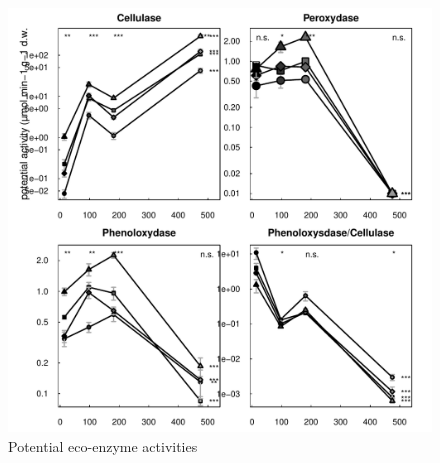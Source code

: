 \documentclass[authoryear,preprint,review,12pt]{elsarticle}
\begin{document}
\newpage
\begin{figure}[h!]
\vspace*{2mm}
\begin{center}
\includegraphics{sbb-enz}
\end{center}
\caption{Potential eco-enzyme activities}
\label{fig:enz}
\end{figure}


\end{document}
